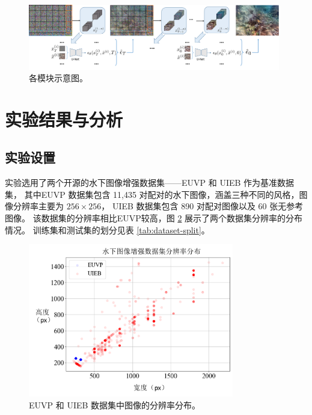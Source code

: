 \begin{figure}[ht]
    \centering
    \includegraphics[width=0.98\textwidth]{figures/ch3/sample_process.pdf}
    \caption{各模块示意图。}
    \label{img:sample_process}
\end{figure} 


\section{实验结果与分析}
\subsection{实验设置}
实验选用了两个开源的水下图像增强数据集——EUVP \cite{funie_gan} 和 UIEB \cite{uieb} 作为基准数据集，
其中EUVP 数据集包含 11,435 对配对的水下图像，涵盖三种不同的风格，图像分辨率主要为 $256 \times 256$，
UIEB 数据集包含 890 对配对图像以及 60 张无参考图像。
该数据集的分辨率相比EUVP较高，图 \ref{img:scatter} 展示了两个数据集分辨率的分布情况。
训练集和测试集的划分见表 \ref{tab:dataset-split}。
\begin{figure}[ht]
    \centering
    \includegraphics[width=0.8\textwidth]{figures/ch3/scatter.pdf}
    \caption{EUVP 和 UIEB 数据集中图像的分辨率分布。}
    \label{img:scatter}
\end{figure}

